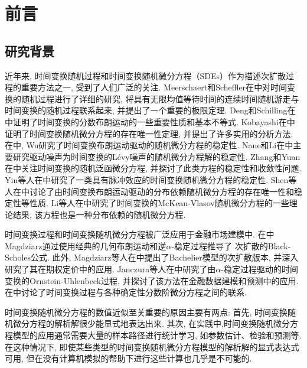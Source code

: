 

\chapter{前言}\label{chap:Intro}

\section{研究背景}\label{sec:background}
近年来, 时间变换随机过程和时间变换随机微分方程（SDEs）作为描述次扩散过程的重要方法之一\cite{Umarov20181}, 受到了人们广泛的关注. Meerschaert和Scheffler在\cite{Meerschaert}中对时间变换的随机过程进行了详细的研究, 将具有无限均值等待时间的连续时间随机游走与时间变换的随机过程联系起来, 并提出了一个重要的极限定理. Deng和Schilling在\cite{Deng2017}中证明了时间变换的分数布朗运动的一些重要性质和基本不等式. Kobayashi在\cite{Kobayashi2011}中证明了时间变换随机微分方程的存在唯一性定理, 并提出了许多实用的分析方法. 在\cite{wu2016stability}中, Wu研究了时间变换布朗运动驱动的随机微分方程的稳定性. Nane和Li在中主要研究驱动噪声为时间变换的Lévy噪声的随机微分方程解的稳定性. Zhang和Yuan在\cite{Zhang2019689}中关注时间变换的随机泛函微分方程, 并探讨了此类方程的稳定性和收敛性问题. Yin等人在\cite{Yin20212338}中研究了一类具有脉冲效应的时间变换随机微分方程的稳定性. Shen等人在\cite{Shen2023}中讨论了由时间变换布朗运动驱动的分布依赖随机微分方程的存在唯一性和稳定性等性质. Li等人在\cite{Li2023}中研究了时间变换的McKean-Vlasov随机微分方程的一些理论结果, 该方程也是一种分布依赖的随机微分方程.

时间变换过程和时间变换随机微分方程被广泛应用于金融市场建模中. 在\cite{Magdziarz2009553}中Magdziarz通过使用经典的几何布朗运动和逆$\alpha$-稳定过程推导了 次扩散的Black-Scholes公式. 此外, Magdziarz等人在\cite{Magdziarz2011187}中提出了Bachelier模型的次扩散版本, 并深入研究了其在期权定价中的应用. Janczura等人在\cite{janczura2011subordinated}中研究了由$\alpha$-稳定过程驱动的时间变换的Ornstein-Uhlenbeck过程, 并探讨了该方法在金融数据建模和预测中的应用. 在中讨论了时间变换过程与各种确定性分数阶微分方程之间的联系.

时间变换随机微分方程的数值近似至关重要的原因主要有两点: 首先, 时间变换随机微分方程的解析解很少能显式地表达出来. 其次, 在实践中,时间变换随机微分方程模型的应用通常需要大量的样本路径进行统计学习, 如参数估计、检验和预测等. 在这种情况下, 即使某些类型的时间变换随机微分方程模型的解析解的显式表达式可用, 但在没有计算机模拟的帮助下进行这些计算也几乎是不可能的.

